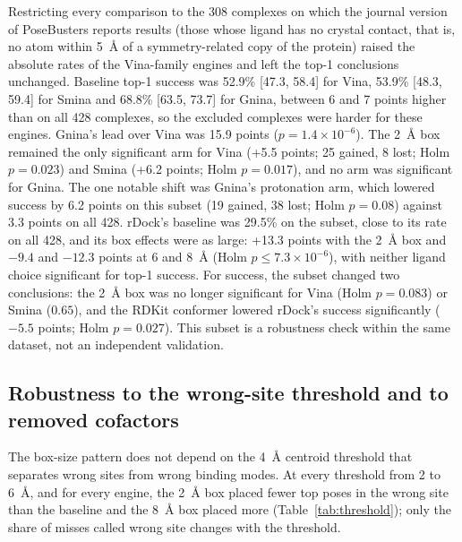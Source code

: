 Restricting every comparison to the 308 complexes on which the journal version of
PoseBusters reports results (those whose ligand has no crystal contact, that is, no atom
within \SI{5}{\angstrom} of a symmetry-related copy of the protein)
raised the absolute rates of the Vina-family engines and left the top-1 conclusions
unchanged. Baseline top-1 success was
52.9\% [47.3, 58.4] for Vina, 53.9\% [48.3, 59.4] for Smina and 68.8\% [63.5, 73.7] for
Gnina, between 6 and 7 points higher than on all 428 complexes, so the excluded complexes
were harder for these engines. Gnina's lead over Vina was 15.9 points
($p = 1.4 \times 10^{-6}$). The \SI{2}{\angstrom} box remained the only significant arm
for Vina (+5.5 points; 25 gained, 8 lost; Holm $p = 0.023$) and Smina (+6.2 points; Holm
$p = 0.017$), and no arm was significant for Gnina. The one notable shift was Gnina's
protonation arm, which lowered success by 6.2 points on this subset (19 gained, 38 lost;
Holm $p = 0.08$) against 3.3 points on all 428. rDock's baseline was 29.5\% on the
subset, close to its rate on all 428, and its box effects were as large: +13.3 points with
the \SI{2}{\angstrom} box and $-9.4$ and $-12.3$ points at 6 and \SI{8}{\angstrom} (Holm
$p \le 7.3 \times 10^{-6}$), with neither ligand choice significant for top-1 success.
For \pbvalid{} success, the subset changed two conclusions: the \SI{2}{\angstrom} box was no
longer significant for Vina (Holm $p = 0.083$) or Smina ($0.65$), and the RDKit conformer
lowered rDock's \pbvalid{} success significantly ($-5.5$ points; Holm $p = 0.027$).
This subset is a robustness check within the same dataset, not an independent validation.

\subsection{Robustness to the wrong-site threshold and to removed cofactors}
\label{sec:robustness}

The box-size pattern does not depend on the \SI{4}{\angstrom} centroid threshold that
separates wrong sites from wrong binding modes. At every threshold from 2 to
\SI{6}{\angstrom}, and for every engine, the \SI{2}{\angstrom} box placed fewer top poses in
the wrong site than the baseline and the \SI{8}{\angstrom} box placed more
(Table~\ref{tab:threshold}); only the share of misses called wrong site changes with the
threshold.

